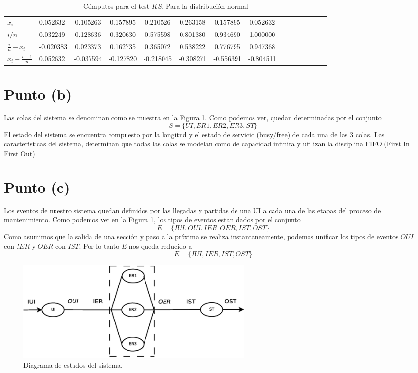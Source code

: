 \documentclass[a4paper,10pt]{article}
\begin{document}
\begin{table}[ht]
\begin{center}
\begin{tabular}{l|l*{12}{c}r}
\hline
$x_i$&0.052632&0.105263&0.157895&0.210526&0.263158&0.157895&0.052632\\
$i/n$&0.032249&0.128636&0.320630&0.575598&0.801380&0.934690&1.000000\\
$\frac{i}{n} - x_i$&-0.020383&0.023373&0.162735&0.365072&0.538222&0.776795&0.947368\\
$x_i - \frac{i-1}{n}$&0.052632&-0.037594&-0.127820&-0.218045&-0.308271&-0.556391&-0.804511\\
\hline
\end{tabular}
\caption{\label{tab:ks_table_norm} Cómputos para el test $KS$. Para la distribución normal}
\end{center}
\end{table}

\section{Punto (b)}
Las colas del sistema se denominan como se muestra en la Figura \ref{fig:events_diagram}. Como podemos ver, quedan
determinadas por el conjunto 
\[
S = \{UI, ER1, ER2, ER3, ST\}
\]
El estado del sistema se encuentra compuesto por la longitud y el estado de servicio (busy/free) de cada una de las 3 colas. Las características del sistema, determinan que todas las colas se modelan como de capacidad infinita y utilizan la disciplina FIFO (First In First Out).

\section{Punto (c)}
Los eventos de nuestro sistema quedan definidos por las llegadas y partidas de una UI a cada una de las etapas del proceso de mantenimiento. Como podemos ver en la Figura \ref{fig:events_diagram}, los tipos de eventos estan dados por el conjunto
\[
 E = \{IUI, OUI, IER, OER, IST, OST\}
\]
Como asumimos que la salida de una sección y paso a la próxima se realiza instantaneamente, podemos unificar los tipos de eventos $OUI$ con $IER$ y $OER$ con $IST$. Por lo tanto $E$ nos queda reducido a
\[
 E = \{IUI, IER, IST, OST\}
\]

\begin{figure}[ht]
\begin{center}
\includegraphics[width=12cm]{./states.eps}
\caption{\label{fig:events_diagram} Diagrama de estados del sistema.}
\end{center}
\end{figure}
\end{document}
